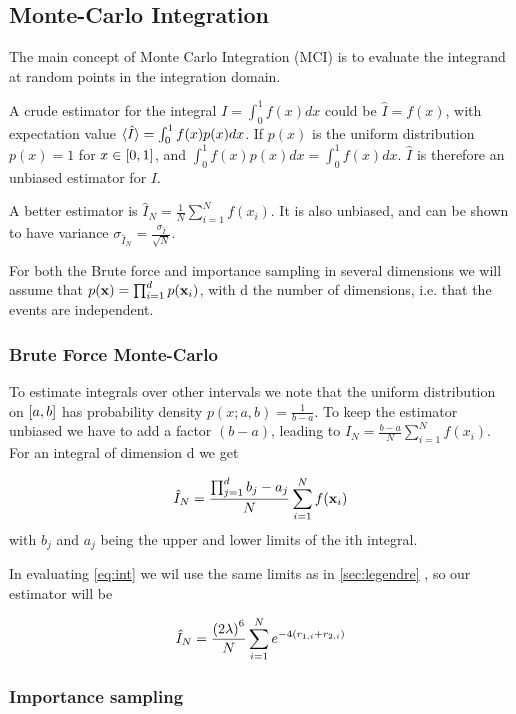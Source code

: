 \subsection{Monte-Carlo Integration}

The main concept of Monte Carlo Integration (MCI) is to evaluate the integrand
at random points in the integration domain.

A crude estimator for the integral $ I = \int_{0}^{1} f(x)dx $ could be $
\hat{I} = f(x)$, with expectation value $\braket{\hat{I}} = \int_{0}^{1}
f(x)p(x)dx$. If $p(x)$ is the uniform distribution $p(x) = 1$ for $x \in
\left[0,1\right]$, and $\int_{0}^{1} f(x)p(x) dx = \int_{0}^{1}f(x) dx$. $\hat{I}$ is
therefore an unbiased estimator for $I$.

A better estimator is $\hat{I}_N = \frac{1}{N}\sum_{i=1}^{N} f(x_i)$. It is also
unbiased, and can be shown to have variance
$\sigma_{\hat{I}_N} = \frac{\sigma_{\hat{I}}}{\sqrt{N}}$.

For both the Brute force and importance sampling in several dimensions we will
assume that $p(\mathbf{x}) = \prod_{i=1}^{d} p(\mathbf{x}_i)$, with d the number of dimensions,
i.e. that the events are independent.

\subsubsection{Brute Force Monte-Carlo}

To estimate integrals over other intervals we note that the uniform
distribution on $\left[a,b\right]$ has probability density $p(x;a,b) = \frac{1}{b-a}$.
To keep the estimator unbiased we have to add a factor $(b-a)$, leading to
$\hat{I}_N = \frac{b-a}{N}\sum_{i=1}^{N}f(x_i)$.
For an integral of dimension d we get

\begin{equation}
  \label{eq:estimator_brute}
  \hat{I}_N
  = \frac{\prod_{j=1}^{d} b_j - a_j }{N}\sum_{i=1}^{N} f(\mathbf{x}_i)
\end{equation}
with $b_j$ and $a_j$ being the upper and lower limits of the ith integral.

In evaluating \cref{eq:int} we wil use the same limits as in \cref{sec:legendre}
, so our estimator will be

\begin{equation}
  \label{eq:estimator_brute_our}
  \hat{I}_N
  = \frac{\left(2\lambda\right)^6}{N} \sum_{i=1}^{N} e^{-4(r_{1,i} + r_{2,i})}
\end{equation}

\subsubsection{Importance sampling}

